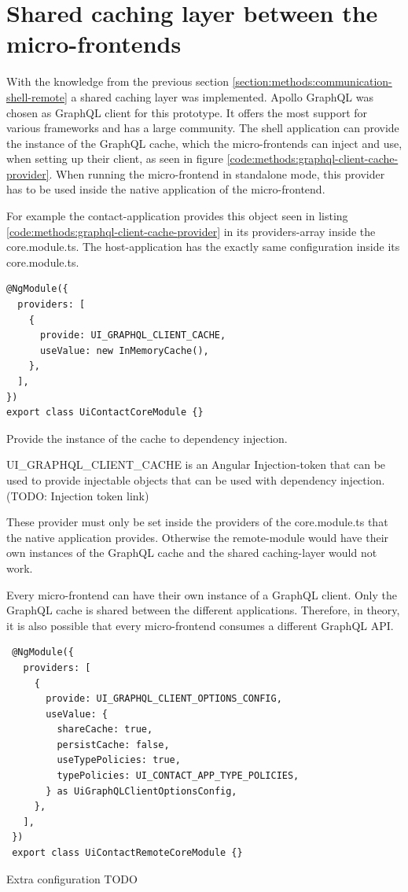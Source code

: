 \section{Shared caching layer between the micro-frontends}

With the knowledge from the previous section \ref{section:methods:communication-shell-remote} a shared caching layer was implemented. Apollo GraphQL was chosen as GraphQL client for this prototype. It offers the most support for various frameworks and has a large community. The shell application can provide the instance of the GraphQL cache, which the micro-frontends can inject and use, when setting up their client, as seen in figure \ref{code:methods:graphql-client-cache-provider}. When running the micro-frontend in standalone mode, this provider has to be used inside the native application of the micro-frontend.

For example the contact-application provides this object seen in listing \ref{code:methods:graphql-client-cache-provider} in its providers-array inside the core.module.ts. The host-application has the exactly same configuration inside its core.module.ts.

\ifshowListings
\begin{listing}[H]
\begin{verbatim}
@NgModule({
  providers: [
    {
      provide: UI_GRAPHQL_CLIENT_CACHE,
      useValue: new InMemoryCache(),
    },
  ],
})
export class UiContactCoreModule {}
\end{verbatim}
\caption{Provide the instance of the cache to dependency injection.}\label{code:methods:graphql-client-cache-provider}
\end{listing}
\fi

UI\_GRAPHQL\_CLIENT\_CACHE is an Angular Injection-token that can be used to provide injectable objects that can be used with dependency injection. (TODO: Injection token link)

These provider must only be set inside the providers of the core.module.ts that the native application provides. Otherwise the remote-module would have their own instances of the GraphQL cache and the shared caching-layer would not work. 

Every micro-frontend can have their own instance of a GraphQL client. Only the GraphQL cache is shared between the different applications. Therefore, in theory, it is also possible that every micro-frontend consumes a different GraphQL API. 

\ifshowListings
\begin{listing}[H]
\begin{verbatim}
 @NgModule({
   providers: [
     {
       provide: UI_GRAPHQL_CLIENT_OPTIONS_CONFIG,
       useValue: {
         shareCache: true,
         persistCache: false,
         useTypePolicies: true,
         typePolicies: UI_CONTACT_APP_TYPE_POLICIES,
       } as UiGraphQLClientOptionsConfig,
     },
   ],
 })
 export class UiContactRemoteCoreModule {}
\end{verbatim}
\caption{Extra configuration TODO}\label{code:methods:graphql-client-extra-configuration-options}
\end{listing}
\fi

